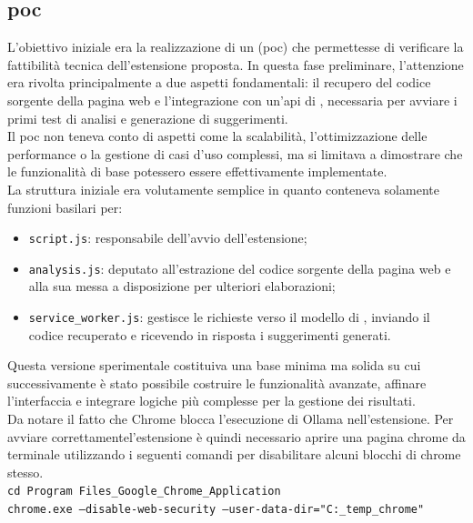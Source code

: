 \subsection{\acrshort{poc}}
\noindent L’obiettivo iniziale era la realizzazione di un  (\acrshort{poc}) che permettesse di verificare la fattibilità tecnica dell’estensione proposta. In questa fase preliminare, l’attenzione era rivolta principalmente a due aspetti fondamentali: il recupero del codice sorgente della pagina web e l’integrazione con un’\acrshort{api} di , necessaria per avviare i primi test di analisi e generazione di suggerimenti.\\
Il \acrshort{poc} non teneva conto di aspetti come la scalabilità, l’ottimizzazione delle performance o la gestione di casi d’uso complessi, ma si limitava a dimostrare che le funzionalità di base potessero essere effettivamente implementate. 
\\La struttura iniziale era volutamente semplice in quanto conteneva solamente funzioni basilari per:
\begin{itemize}
  \item \texttt{script.js}: responsabile dell’avvio dell’estensione;
  \item \texttt{analysis.js}: deputato all’estrazione del codice sorgente della pagina web e alla sua messa a disposizione per ulteriori elaborazioni;
  \item \texttt{service\_worker.js}: gestisce le richieste verso il modello di , inviando il codice recuperato e ricevendo in risposta i suggerimenti generati.
\end{itemize}

\noindent Questa versione sperimentale costituiva una base minima ma solida su cui successivamente è stato possibile costruire le funzionalità avanzate, affinare l’interfaccia e integrare logiche più complesse per la gestione dei risultati.\\

\noindent Da notare il fatto che Chrome blocca l'esecuzione di Ollama nell'estensione. Per avviare correttamentel'estensione è quindi necessario aprire una pagina chrome da terminale utilizzando i seguenti comandi per disabilitare alcuni blocchi di chrome stesso.\\
\texttt{cd Program Files\_Google\_Chrome\_Application\\
chrome.exe --disable-web-security --user-data-dir="C:\_temp\_chrome"}


